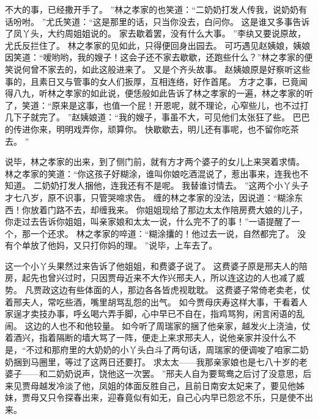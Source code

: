 不大的事，已经撒开手了。
”林之孝家的也笑道：“二奶奶打发人传我，说奶奶有话吩咐。
”尤氏笑道：“这是那里的话，只当你没去，白问你。
这是谁又多事告诉了凤丫头，大约周姐姐说的。
家去歇着罢，没有什么大事。
”李纨又要说原故，尤氏反拦住了。
林之孝家的见如此，只得便回身出园去。
可巧遇见赵姨娘，姨娘因笑道：“嗳哟哟，我的嫂子！这会子还不家去歇歇，还跑些什么？”林之孝家的便笑说何曾不家去的，如此这般进来了。
又是个齐头故事。
赵姨娘原是好察听这些事的，且素日又与管事的女人们扳厚，互相连络，好作首尾。
方才之事，已竟闻得八九，听林之孝家的如此说，便恁般如此告诉了林之孝家的一遍，林之孝家的听了，笑道：“原来是这事，也值一个屁！开恩呢，就不理论，心窄些儿，也不过打几下子就完了。
”赵姨娘道：“我的嫂子，事虽不大，可见他们太张狂了些。
巴巴的传进你来，明明戏弄你，顽算你。
快歇歇去，明儿还有事呢，也不留你吃茶去。
”\par
说毕，林之孝家的出来，到了侧门前，就有方才两个婆子的女儿上来哭着求情。
林之孝家的笑道：“你这孩子好糊涂，谁叫你娘吃酒混说了，惹出事来，连我也不知道。
二奶奶打发人捆他，连我还有不是呢。
我替谁讨情去。
”这两个小丫头子才七八岁，原不识事，只管哭啼求告。
缠的林之孝家的没法，因说道：“糊涂东西！你放着门路不去，却缠我来。
你姐姐现给了那边太太作陪房费大娘的儿子，你走过去告诉你姐姐，叫亲家娘和太太一说，什么完不了的事！”一语提醒了一个，那一个还求。
林之孝家的啐道：“糊涂攮的！他过去一说，自然都完了。
没有个单放了他妈，又只打你妈的理。
”说毕，上车去了。
\par
这一个小丫头果然过来告诉了他姐姐，和费婆子说了。
这费婆子原是邢夫人的陪房，起先也曾兴过时，只因贾母近来不大作兴邢夫人，所以连这边的人也减了威势。
凡贾政这边有些体面的人，那边各各皆虎视耽耽。
这费婆子常倚老卖老，仗着邢夫人，常吃些酒，嘴里胡骂乱怨的出气。
如今贾母庆寿这样大事，干看着人家逞才卖技办事，呼幺喝六弄手脚，心中早已不自在，指鸡骂狗，闲言闲语的乱闹。
这边的人也不和他较量。
如今听了周瑞家的捆了他亲家，越发火上浇油，仗着酒兴，指着隔断的墙大骂了一阵，便走上来求邢夫人，说他亲家并没什么不是，“不过和那府里的大奶奶的小丫头白斗了两句话，周瑞家的便调唆了咱家二奶奶捆到马圈里，等过了这两日还要打。
求太太——我那亲家娘也是七八十岁的老婆子——和二奶奶说声，饶他这一次罢。
”邢夫人自为要鸳鸯之后讨了没意思，后来见贾母越发冷淡了他，凤姐的体面反胜自己，且前日南安太妃来了，要见他姊妹，贾母又只令探春出来，迎春竟似有如无，自己心内早已怨忿不乐，只是使不出来。
